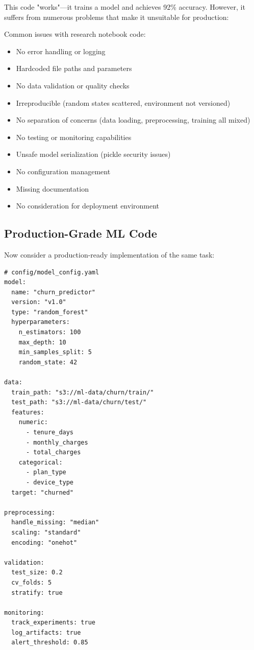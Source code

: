 This code "works"—it trains a model and achieves 92\% accuracy. However, it suffers from numerous problems that make it unsuitable for production:

\begin{warning}
Common issues with research notebook code:
\begin{itemize}
    \item No error handling or logging
    \item Hardcoded file paths and parameters
    \item No data validation or quality checks
    \item Irreproducible (random states scattered, environment not versioned)
    \item No separation of concerns (data loading, preprocessing, training all mixed)
    \item No testing or monitoring capabilities
    \item Unsafe model serialization (pickle security issues)
    \item No configuration management
    \item Missing documentation
    \item No consideration for deployment environment
\end{itemize}
\end{warning}

\subsection{Production-Grade ML Code}

Now consider a production-ready implementation of the same task:

\begin{lstlisting}[style=yaml, caption=Production ML Pipeline - Configuration]
# config/model_config.yaml
model:
  name: "churn_predictor"
  version: "v1.0"
  type: "random_forest"
  hyperparameters:
    n_estimators: 100
    max_depth: 10
    min_samples_split: 5
    random_state: 42

data:
  train_path: "s3://ml-data/churn/train/"
  test_path: "s3://ml-data/churn/test/"
  features:
    numeric:
      - tenure_days
      - monthly_charges
      - total_charges
    categorical:
      - plan_type
      - device_type
  target: "churned"

preprocessing:
  handle_missing: "median"
  scaling: "standard"
  encoding: "onehot"

validation:
  test_size: 0.2
  cv_folds: 5
  stratify: true

monitoring:
  track_experiments: true
  log_artifacts: true
  alert_threshold: 0.85
\end{lstlisting}

